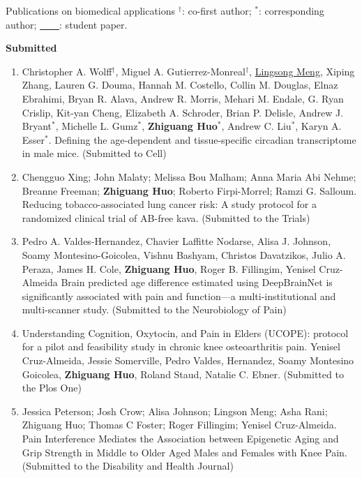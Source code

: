 \documentclass{resume} %
\begin{document}
\begin{rSection}{Publications on biomedical applications}
$^\dagger$: co-first author; $^*$: corresponding author; \underline{\mbox{ }\mbox{ }\mbox{ }\mbox{ }}: student paper.


\textbf{Submitted}
\begin{enumerate}[noitemsep,topsep=0pt]

\item 
Christopher A. Wolff$^\dagger$, Miguel A. Gutierrez-Monreal$^\dagger$, \underline{Lingsong Meng}, Xiping Zhang, Lauren G. Douma, Hannah M. Costello, Collin M. Douglas, Elnaz Ebrahimi, Bryan R. Alava, Andrew R. Morris, Mehari M. Endale, G. Ryan Crislip, Kit-yan Cheng, Elizabeth A. Schroder, Brian P. Delisle, Andrew J. Bryant$^*$, Michelle L. Gumz$^*$, {\bf Zhiguang Huo}$^*$, Andrew C. Liu$^*$, Karyn A. Esser$^*$.
Defining the age-dependent and tissue-specific circadian transcriptome in male mice.
(Submitted to Cell)


\item 
Chengguo Xing; John Malaty; Melissa Bou Malham; Anna Maria Abi Nehme; Breanne Freeman; {\bf Zhiguang Huo}; Roberto Firpi-Morrel; Ramzi G. Salloum. 
Reducing tobacco-associated lung cancer risk: A study protocol for a randomized clinical trial of AB-free kava.
(Submitted to the Trials)



\item 
Pedro A. Valdes-Hernandez, Chavier Laffitte Nodarse, Alisa J. Johnson, Soamy  Montesino-Goicolea, Vishnu Bashyam, Christos Davatzikos, Julio A. Peraza, James H. Cole, {\bf Zhiguang Huo}, Roger B. Fillingim, Yenisel Cruz-Almeida
Brain predicted age difference estimated using DeepBrainNet is significantly associated with pain and function—a multi-institutional and multi-scanner study.
(Submitted to the Neurobiology of Pain)


\item 
Understanding Cognition, Oxytocin, and Pain in Elders (UCOPE): protocol for a pilot and feasibility study in chronic knee osteoarthritis pain. 
Yenisel Cruz-Almeida, Jessie Somerville, Pedro Valdes, Hernandez, Soamy Montesino Goicolea, {\bf Zhiguang Huo}, Roland Staud, Natalie C. Ebner.
(Submitted to the Plos One)

\item 
Jessica Peterson; Josh Crow; Alisa Johnson; Lingson Meng; Asha Rani; Zhiguang Huo; Thomas C Foster; Roger Fillingim; Yenisel Cruz-Almeida.
Pain Interference Mediates the Association between Epigenetic Aging and Grip Strength in Middle to Older Aged Males and Females with Knee Pain.
(Submitted to the Disability and Health Journal)



\end{enumerate}
\end{rSection}
\end{document}
